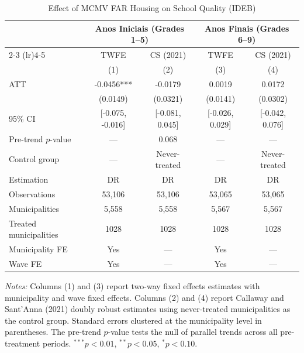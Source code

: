 \begin{table}[t]
\centering
\caption{Effect of MCMV FAR Housing on School Quality (IDEB)}
\label{tab:main}
\begin{threeparttable}
\begin{tabular}{lcccc}
\toprule
 & \multicolumn{2}{c}{Anos Iniciais (Grades 1--5)} & \multicolumn{2}{c}{Anos Finais (Grades 6--9)} \\
\cmidrule(lr){2-3} \cmidrule(lr){4-5}
 & TWFE & CS (2021) & TWFE & CS (2021) \\
 & (1) & (2) & (3) & (4) \\
\midrule
ATT & -0.0456*** & -0.0179 & 0.0019 & 0.0172 \\
 & (0.0149) & (0.0321) & (0.0141) & (0.0302) \\
{} 95\% CI & [-0.075, -0.016] & [-0.081, 0.045] & [-0.026, 0.029] & [-0.042, 0.076] \\
\midrule
Pre-trend $p$-value & --- & 0.068 & --- & --- \\
Control group & --- & Never-treated & --- & Never-treated \\
Estimation & DR & DR & DR & DR \\
Observations & 53,106 & 53,106 & 53,065 & 53,065 \\
Municipalities & 5,558 & 5,558 & 5,567 & 5,567 \\
Treated municipalities & 1028 & 1028 & 1028 & 1028 \\
Municipality FE & Yes & --- & Yes & --- \\
Wave FE & Yes & --- & Yes & --- \\
\bottomrule
\end{tabular}
\begin{tablenotes}
\item \textit{Notes:} Columns (1) and (3) report two-way fixed effects estimates with municipality and wave fixed effects. Columns (2) and (4) report Callaway and Sant'Anna (2021) doubly robust estimates using never-treated municipalities as the control group. Standard errors clustered at the municipality level in parentheses. The pre-trend $p$-value tests the null of parallel trends across all pre-treatment periods. $^{***}p<0.01$, $^{**}p<0.05$, $^{*}p<0.10$.
\end{tablenotes}
\end{threeparttable}
\end{table}
